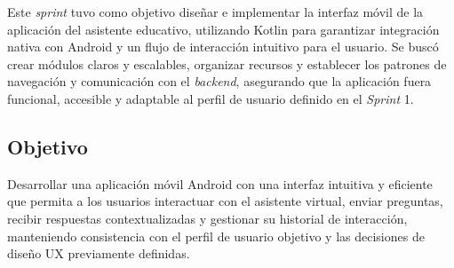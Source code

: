 Este \textit{sprint} tuvo como objetivo diseñar e implementar la interfaz móvil
de la aplicación del asistente educativo, utilizando Kotlin para garantizar
integración nativa con Android y un flujo de interacción intuitivo para el
usuario. Se buscó crear módulos claros y escalables, organizar recursos y
establecer los patrones de navegación y comunicación con el \textit{backend},
asegurando que la aplicación fuera funcional, accesible y adaptable al perfil
de usuario definido en el \textit{Sprint} 1.

\subsection{Objetivo}
Desarrollar una aplicación móvil Android con una interfaz intuitiva y eficiente
que permita a los usuarios interactuar con el asistente virtual, enviar
preguntas, recibir respuestas contextualizadas y gestionar su historial de
interacción, manteniendo consistencia con el perfil de usuario objetivo y las
decisiones de diseño UX previamente definidas.


